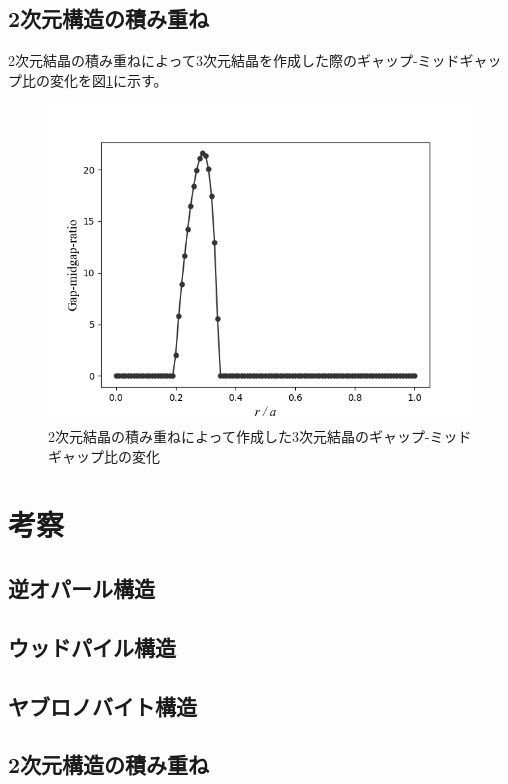 \documentclass[platex,dvipdfmx]{jsreport}
\numberwithin{equation}{section}
\begin{document}
\subsection{2次元構造の積み重ね}
2次元結晶の積み重ねによって3次元結晶を作成した際のギャップ-ミッドギャップ比の変化を図\ref{fig:stack-crystals}に示す。
\begin{figure}[htbp]
  \centering
  \includegraphics[width=0.8\linewidth]{results/stack-crystals.png}
  \caption{2次元結晶の積み重ねによって作成した3次元結晶のギャップ-ミッドギャップ比の変化}
  \label{fig:stack-crystals}
\end{figure}


\section{考察}
\subsection{逆オパール構造}
\subsection{ウッドパイル構造}
\subsection{ヤブロノバイト構造}
\subsection{2次元構造の積み重ね}
\end{document}
